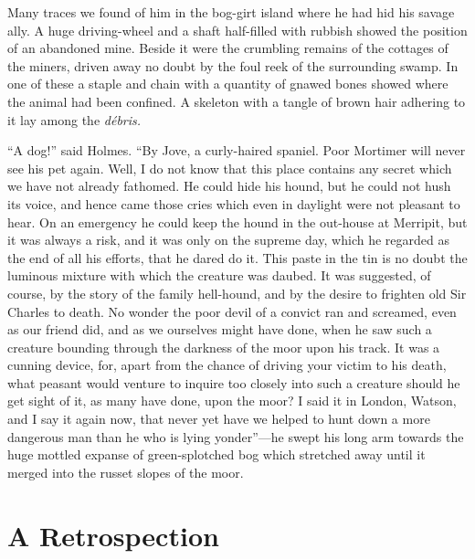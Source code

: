 \documentclass[paper=a5,BCOR=7mm,twoside,DIV=calc,12pt,usegeometry,openany,chapterprefix,endperiod,headings=big]{scrbook} %
\begin{document}
Many traces we found of him in the bog-girt island where he had hid his savage ally. A huge driving-wheel and a shaft half-filled with rubbish showed the position of an abandoned mine. Beside it were the crumbling remains of the cottages of the miners, driven away no doubt by the foul reek of the surrounding swamp. In one of these a staple and chain with a quantity of gnawed bones showed where the animal had been confined. A skeleton with a tangle of brown hair adhering to it lay among the \textit{débris.}

\enquote{A dog!} said Holmes. \enquote{By Jove, a curly-haired spaniel. Poor Mortimer will never see his pet again. Well, I do not know that this place contains any secret which we have not already fathomed. He could hide his hound, but he could not hush its voice, and hence came those cries which even in daylight were not pleasant to hear. On an emergency he could keep the hound in the out-house at Merripit, but it was always a risk, and it was only on the supreme day, which he regarded as the end of all his efforts, that he dared do it. This paste in the tin is no doubt the luminous mixture with which the creature was daubed. It was suggested, of course, by the story of the family hell-hound, and by the desire to frighten old Sir Charles to death. No wonder the poor devil of a convict ran and screamed, even as our friend did, and as we ourselves might have done, when he saw such a creature bounding through the darkness of the moor upon his track. It was a cunning device, for, apart from the chance of driving your victim to his death, what peasant would venture to inquire too closely into such a creature should he get sight of it, as many have done, upon the moor? I said it in London, Watson, and I say it again now, that never yet have we helped to hunt down a more dangerous man than he who is lying yonder}---he swept his long arm towards the huge mottled expanse of green-splotched bog which stretched away until it merged into the russet slopes of the moor.

\chapter{A Retrospection}
\end{document}
